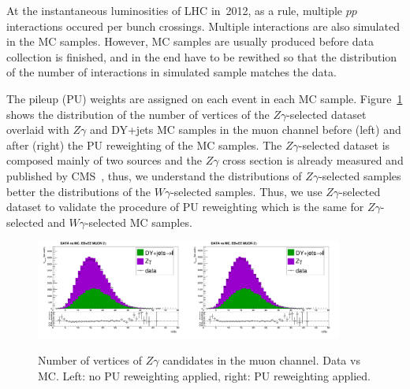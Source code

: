 At the instantaneous luminosities of LHC in~2012, as a rule, multiple $pp$ interactions occured per bunch crossings. Multiple interactions are also simulated in the MC samples. However, MC samples are usually produced before data collection is finished, and in the end have to be rewithed so that the distribution of the number of interactions in simulated sample matches the data.

The pileup (PU) weights are assigned on each event in each MC sample. Figure~\ref{fig:DATAvsMC_nVtx} shows the distribution of the number of vertices of the $Z\gamma$-selected dataset overlaid with $Z\gamma$ and DY+jets MC samples in the muon channel before (left) and after (right) the PU reweighting of the MC samples. The $Z\gamma$-selected dataset is composed mainly of two sources and the $Z\gamma$ cross section is already measured and published by CMS~\cite{ref_Zg8TeV}, thus, we understand the distributions of $Z\gamma$-selected samples better the distributions of the $W\gamma$-selected samples. Thus, we use $Z\gamma$-selected dataset to validate the procedure of PU reweighting which is the same for $Z\gamma$-selected and $W\gamma$-selected MC samples.

\begin{figure}[htb]
  \begin{center}
   \includegraphics[width=0.45\textwidth]{../figs/figs_v11/MUON_ZGamma/PrepareYields/c_TotalDATAvsMC_EtaCommon__nVtx_noPU.png}\includegraphics[width=0.45\textwidth]{../figs/figs_v11/MUON_ZGamma/PrepareYields/c_TotalDATAvsMC_EtaCommon__nVtx.png}
  \caption{Number of vertices of $Z\gamma$ candidates in the muon channel. Data vs MC. Left: no PU reweighting applied, right: PU reweighting applied. }
  \label{fig:DATAvsMC_nVtx}
  \end{center}
\end{figure}
